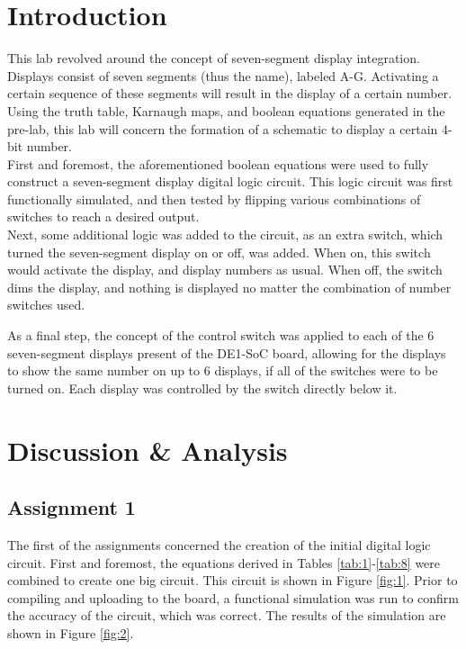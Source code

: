 \documentclass[
	letterpaper, %
	10pt, %
]{CSUniSchoolLabReport}
\begin{document}
\section{Introduction}

\hspace{.5 in} This lab revolved around the concept of seven-segment display integration. Displays consist of seven segments (thus the name), labeled A-G. Activating a certain sequence of these segments will result in the display of a certain number. Using the truth table, Karnaugh maps, and boolean equations generated in the pre-lab, this lab will concern the formation of a schematic to display a certain 4-bit number.\\

\hspace{.5 in} First and foremost, the aforementioned boolean equations were used to fully construct a seven-segment display digital logic circuit. This logic circuit was first functionally simulated, and then tested by flipping various combinations of switches to reach a desired output.\\

\hspace{.5 in} Next, some additional logic was added to the circuit, as an extra switch, which turned the seven-segment display on or off, was added. When on, this switch would activate the display, and display numbers as usual. When off, the switch dims the display, and nothing is displayed no matter the combination of number switches used.

\hspace{.5 in} As a final step, the concept of the control switch was applied to each of the 6 seven-segment displays present of the DE1-SoC board, allowing for the displays to show the same number on up to 6 displays, if all of the switches were to be turned on. Each display was controlled by the switch directly below it.

\section{Discussion \& Analysis} 

\subsection{Assignment 1}

\hspace{.5 in} The first of the assignments concerned the creation of the initial digital logic circuit. First and foremost, the equations derived in Tables \ref{tab:1}-\ref{tab:8} were combined to create one big circuit. This circuit is shown in Figure \ref{fig:1}. Prior to compiling and uploading to the board, a functional simulation was run to confirm the accuracy of the circuit, which was correct. The results of the simulation are shown in Figure \ref{fig:2}.
\end{document}
